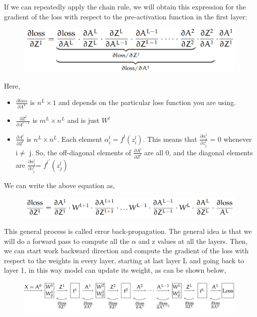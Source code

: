 If we can repeatedly apply the chain rule, we will obtain this expression for the gradient of the loss with respect to the pre-activation function in the first layer:
\begin{figure}[H]
    \centering
    \includegraphics[scale=0.3]{Figures/ml__8.png}
    \label{fig:my_label}
\end{figure}


Here,
\begin{itemize}
    \item $\frac{\partial loss}{\partial A^L}$ is $n^L \times 1$ and depends on the particular loss function you are using.
    \item $\frac{\partial Z^l}{\partial A^{l-1}}$ is $m^L \times n^L$ and is just $W^l$
    \item $\frac{\partial A^l}{\partial Z^l}$ is $n^L \times n^L$. Each element $\alpha_i ^l = f^l(z_i ^l)$. This means that $\frac{\partial \alpha_i ^l}{\partial z_j ^l}$ = 0 whenever i$\neq$ j. So, the off-diagonal elements of $\frac{\partial A^l}{\partial Z^l}$ are all 0, and the diagonal elements are $\frac{\partial \alpha_i ^l}{\partial z_j ^l}$= ${f^l}^'(z_j ^l)$
\end{itemize}
We can write the above equation as,
\begin{figure}[H]
    \centering
    \includegraphics[scale=0.3]{Figures/ml__09.png}
    \label{fig:my_label}
\end{figure}

This general process is called error back-propagation. The general idea is that we will do a forward
pass to compute all the $\alpha$ and z values at all the layers. Then, we can start work backward direction and compute the gradient of the loss with respect
to the weights in every layer, starting at last layer L and going back to layer 1, in this way model can update its weight, as can be shown below,\\
\begin{figure}[H]
    \centering
    \includegraphics[scale=0.3]{Figures/ml__10.png}
    \label{fig:my_label}
\end{figure}




